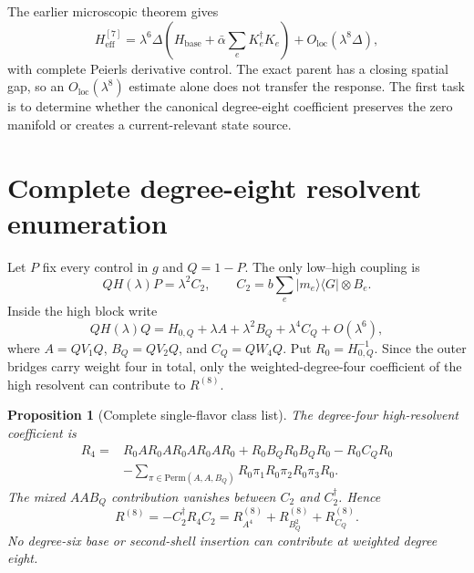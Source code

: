 \documentclass[11pt]{article}
\newtheorem{proposition}[theorem]{Proposition}
\theoremstyle{definition}
\theoremstyle{remark}
\newcommand{\ket}[1]{\lvert #1\rangle}
\newcommand{\bra}[1]{\langle #1\rvert}
\begin{document}
The earlier microscopic theorem gives
\begin{equation}
 H_{\mathrm{eff}}^{[7]}
 =\lambda^6\Delta\left(H_{\mathrm{base}}+\bar\alpha\sum_eK_e^\dagger K_e\right)
 +O_{\mathrm{loc}}(\lambda^8\Delta),
 \label{eq:degree6}
\end{equation}
with complete Peierls derivative control.  The exact parent has a closing spatial gap, so an $O_{\mathrm{loc}}(\lambda^8)$ estimate alone does not transfer the response.  The first task is to determine whether the canonical degree-eight coefficient preserves the zero manifold or creates a current-relevant state source.

\section{Complete degree-eight resolvent enumeration}

Let $P$ fix every control in $g$ and $Q=1-P$.  The only low--high coupling is
\begin{equation}
 QH(\lambda)P=\lambda^2C_2,
 \qquad
 C_2=b\sum_e\ket{m_e}\bra{G}\otimes B_e.
 \label{eq:C2}
\end{equation}
Inside the high block write
\begin{equation}
 QH(\lambda)Q=H_{0,Q}+\lambda A+\lambda^2B_Q+\lambda^4C_Q+O(\lambda^6),
 \label{eq:HQ}
\end{equation}
where $A=QV_1Q$, $B_Q=QV_2Q$, and $C_Q=QW_4Q$.  Put $R_0=H_{0,Q}^{-1}$.  Since the outer bridges carry weight four in total, only the weighted-degree-four coefficient of the high resolvent can contribute to $R^{(8)}$.

\begin{proposition}[Complete single-flavor class list]
\label{prop:class-list}
The degree-four high-resolvent coefficient is
\begin{align}
 R_4={}&R_0AR_0AR_0AR_0AR_0
 +R_0B_QR_0B_QR_0-R_0C_QR_0
 \nonumber\\
 &-\sum_{\pi\in\mathrm{Perm}(A,A,B_Q)}
 R_0\pi_1R_0\pi_2R_0\pi_3R_0.
 \label{eq:R4}
\end{align}
The mixed $AAB_Q$ contribution vanishes between $C_2$ and $C_2^\dagger$.  Hence
\begin{equation}
 R^{(8)}=-C_2^\dagger R_4C_2
 =R_{A^4}^{(8)}+R_{B_Q^2}^{(8)}+R_{C_Q}^{(8)}.
 \label{eq:R8classes}
\end{equation}
No degree-six base or second-shell insertion can contribute at weighted degree eight.
\end{proposition}
\end{document}

